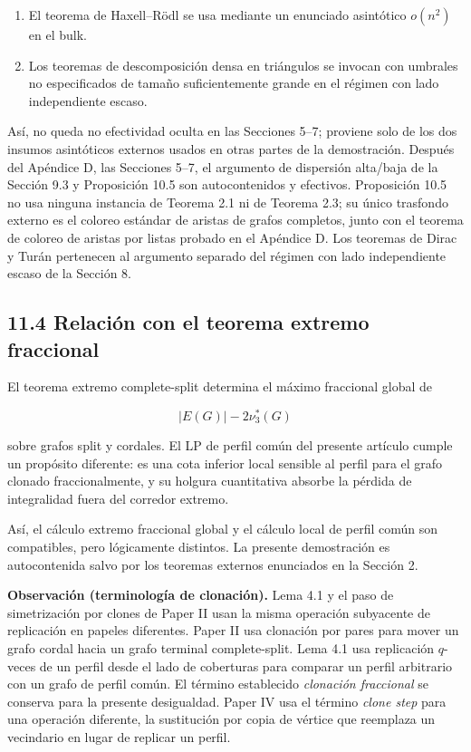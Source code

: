 \documentclass[
  11pt,
]{article}
\providecommand{\tightlist}{%
  \setlength{\itemsep}{0pt}\setlength{\parskip}{0pt}}
\begin{document}
\begin{enumerate}
\def\labelenumi{\arabic{enumi}.}
\tightlist
\item
  El teorema de Haxell--Rödl se usa mediante un enunciado asintótico \(o(n^2)\) en el bulk.
\item
  Los teoremas de descomposición densa en triángulos se invocan con umbrales no especificados de tamaño suficientemente grande en el régimen con lado independiente escaso.
\end{enumerate}

Así, no queda no efectividad oculta en las Secciones 5--7; proviene solo de los dos insumos asintóticos externos usados en otras partes de la demostración. Después del Apéndice D, las Secciones 5--7, el argumento de dispersión alta/baja de la Sección 9.3 y Proposición 10.5 son autocontenidos y efectivos. Proposición 10.5 no usa ninguna instancia de Teorema 2.1 ni de Teorema 2.3; su único trasfondo externo es el coloreo estándar de aristas de grafos completos, junto con el teorema de coloreo de aristas por listas probado en el Apéndice D. Los teoremas de Dirac y Turán pertenecen al argumento separado del régimen con lado independiente escaso de la Sección 8.

\subsection{11.4 Relación con el teorema extremo fraccional}\label{relaciuxf3n-con-el-teorema-extremo-fraccional}

El teorema extremo complete-split determina el máximo fraccional global de

\[
|E(G)|-2\nu_3^*(G)
\]

sobre grafos split y cordales. El LP de perfil común del presente artículo cumple un propósito diferente: es una cota inferior local sensible al perfil para el grafo clonado fraccionalmente, y su holgura cuantitativa absorbe la pérdida de integralidad fuera del corredor extremo.

Así, el cálculo extremo fraccional global y el cálculo local de perfil común son compatibles, pero lógicamente distintos. La presente demostración es autocontenida salvo por los teoremas externos enunciados en la Sección 2.

\textbf{Observación (terminología de clonación).} Lema 4.1 y el paso de simetrización por clones de Paper II usan la misma operación subyacente de replicación en papeles diferentes. Paper II usa clonación por pares para mover un grafo cordal hacia un grafo terminal complete-split. Lema 4.1 usa replicación \(q\)-veces de un perfil desde el lado de coberturas para comparar un perfil arbitrario con un grafo de perfil común. El término establecido \emph{clonación fraccional} se conserva para la presente desigualdad. Paper IV usa el término \emph{clone step} para una operación diferente, la sustitución por copia de vértice que reemplaza un vecindario en lugar de replicar un perfil.
\end{document}
